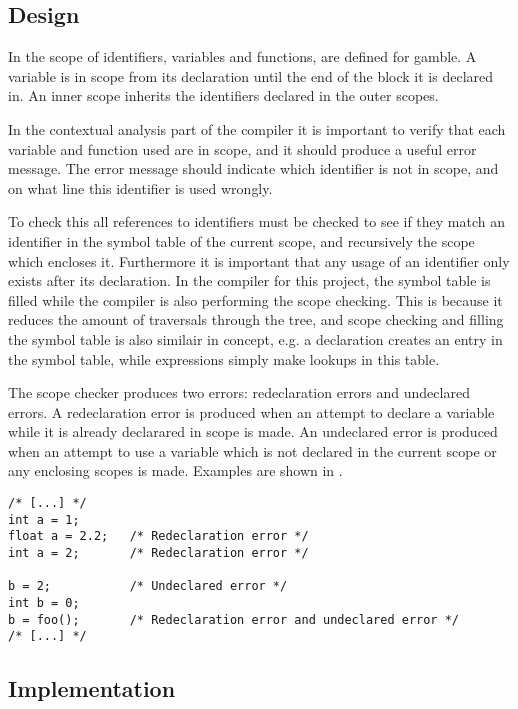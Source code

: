 \subsection*{Design}
In  the scope of identifiers, variables and functions, are defined for \gls{gamble}.
A variable is in scope from its declaration until the end of the block it is declared in.
An inner scope inherits the identifiers declared in the outer scopes. 

In the contextual analysis part of the compiler it is important to verify that each variable and function used are in scope, and it should produce a useful error message.
The error message should indicate which identifier is not in scope, and on what line this identifier is used wrongly.

To check this all references to identifiers must be checked to see if they match an identifier in the symbol table of the current scope, and recursively the scope which encloses it. 
Furthermore it is important that any usage of an identifier only exists after its declaration.
In the compiler for this project, the symbol table is filled while the compiler is also performing the scope checking.
This is because it reduces the amount of traversals through the tree, and scope checking and filling the symbol table is also similair in concept, e.g. a declaration creates an entry in the symbol table, while expressions simply make lookups in this table.

The scope checker produces two errors: redeclaration errors and undeclared errors.
A redeclaration error is produced when an attempt to declare a variable while it is already declarared in scope is made.
An undeclared error is produced when an attempt to use a variable which is not declared in the current scope or any enclosing scopes is made. 
Examples are shown in .

\begin{lstlisting}[caption=Examples of scope errors in \gls{gamble}, numbers=none,frame=tlrb,label={lst:scopeErrors}]
/* [...] */
int a = 1;
float a = 2.2;   /* Redeclaration error */
int a = 2;       /* Redeclaration error */ 

b = 2;           /* Undeclared error */   
int b = 0;
b = foo();       /* Redeclaration error and undeclared error */ 
/* [...] */
\end{lstlisting}

\subsection*{Implementation}
